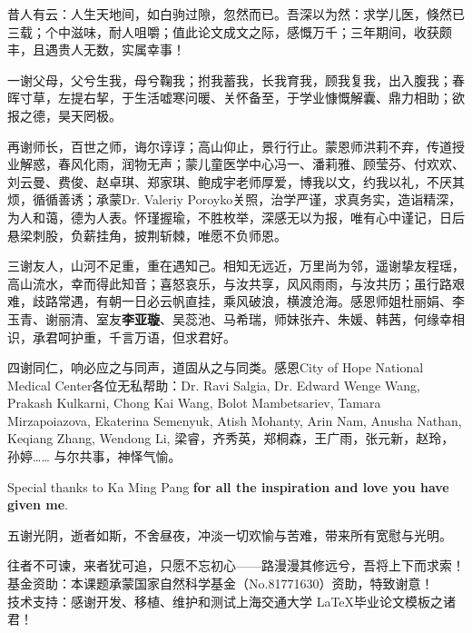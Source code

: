 \begin{thanks}
  昔人有云：人生天地间，如白驹过隙，忽然而已。吾深以为然：求学儿医，倏然已三载；个中滋味，耐人咀嚼；值此论文成文之际，感慨万千；三年期间，收获颇丰，且遇贵人无数，实属幸事！

  一谢父母，父兮生我，母兮鞠我；拊我蓄我，长我育我，顾我复我，出入腹我；春晖寸草，左提右挈，于生活嘘寒问暖、关怀备至，于学业慷慨解囊、鼎力相助；欲报之德，昊天罔极。

  再谢师长，百世之师，诲尔谆谆；高山仰止，景行行止。蒙恩师洪莉不弃，传道授业解惑，春风化雨，润物无声；蒙儿童医学中心冯一、潘莉雅、顾莹芬、付欢欢、刘云曼、费俊、赵卓琪、郑家琪、鲍成宇老师厚爱，博我以文，约我以礼，不厌其烦，循循善诱；承蒙Dr. Valeriy Poroyko关照，治学严谨，求真务实，造诣精深，为人和蔼，德为人表。怀瑾握瑜，不胜枚举，深感无以为报，唯有心中谨记，日后悬梁刺股，负薪挂角，披荆斩棘，唯愿不负师恩。

  三谢友人，山河不足重，重在遇知己。相知无远近，万里尚为邻，遥谢挚友程瑶，高山流水，幸而得此知音；喜怒哀乐，与汝共享，风风雨雨，与汝共历；虽行路艰难，歧路常遇，有朝一日必云帆直挂，乘风破浪，横渡沧海。感恩师姐杜丽娟、李玉青、谢丽清、室友\textbf{李亚璇}、吴蕊池、马希瑞，师妹张卉、朱媛、韩茜，何缘幸相识，承君呵护重，千言万语，但求君好。

  四谢同仁，响必应之与同声，道固从之与同类。感恩City of Hope National Medical Center各位无私帮助：Dr. Ravi Salgia, Dr. Edward Wenge Wang, Prakash Kulkarni, Chong Kai Wang, Bolot Mambetsariev, Tamara Mirzapoiazova, Ekaterina Semenyuk, Atish Mohanty, Arin Nam, Anusha Nathan, Keqiang Zhang, Wendong Li, 梁睿，齐秀英，郑桐森，王广雨，张元新，赵玲，孙婷…… 与尔共事，神怿气愉。

  Special thanks to Ka Ming Pang \textbf{for all the inspiration and love you have given me}.

  五谢光阴，逝者如斯，不舍昼夜，冲淡一切欢愉与苦难，带来所有宽慰与光明。

  往者不可谏，来者犹可追，只愿不忘初心——路漫漫其修远兮，吾将上下而求索！\\
  基金资助：本课题承蒙国家自然科学基金（No.81771630）资助，特致谢意！\\
  技术支持：感谢开发、移植、维护和测试上海交通大学 \LaTeX 毕业论文模板之诸君！\\
\end{thanks}
